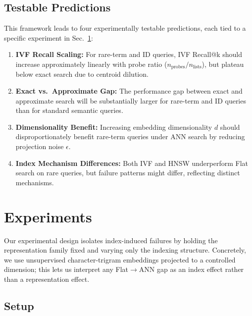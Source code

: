 \documentclass[conference]{IEEEtran}
\begin{document}
\subsection{Testable Predictions}\label{sec:predictions}

This framework leads to four experimentally testable predictions, each tied to a specific experiment in Sec.~\ref{sec:experiments}:

\begin{enumerate}
\item \textbf{IVF Recall Scaling:} For rare-term and ID queries, IVF Recall@k should increase approximately linearly with probe ratio ($n_{\text{probes}}/n_{\text{lists}}$), but plateau below exact search due to centroid dilution.

\item \textbf{Exact vs.\ Approximate Gap:} The performance gap between exact and approximate search will be substantially larger for rare-term and ID queries than for standard semantic queries.

\item \textbf{Dimensionality Benefit:} Increasing embedding dimensionality $d$ should disproportionately benefit rare-term queries under ANN search by reducing projection noise $\epsilon$.

\item \textbf{Index Mechanism Differences:} Both IVF and HNSW underperform Flat search on rare queries, but failure patterns might differ, reflecting distinct mechanisms.
\end{enumerate}

\section{Experiments}\label{sec:experiments}

Our experimental design isolates index-induced failures by holding the representation family fixed and varying only the indexing structure. Concretely, we use unsupervised character-trigram embeddings projected to a controlled dimension; this lets us interpret any Flat$\to$ANN gap as an index effect rather than a representation effect.

\subsection{Setup}\label{sec:setup}
\end{document}
